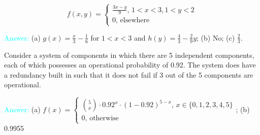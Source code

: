 \documentclass[14pt]{exam}
\begin{document}
\begin{questions}
		$$
			f(x, y) = \begin{cases}
				\frac{3x - y}{9},\, 1 < x < 3, 1 < y < 2\\
				0,\, \text{elsewhere}
			\end{cases}
		$$
		
		
		\textcolor{cyan}{Answer:} (a) $g(x) = \frac{x}{3} - \frac{1}{6}$ for $1 < x < 3$ and $h(y) = \frac{4}{3} - \frac{2}{9}y$; (b) No; (c) $\frac{2}{3}$.
		
		\question
		Consider a system of components in which there are 5 independent components, each of which possesses an operational probability of 0.92. The system does have a redundancy built in such that it does not fail if 3 out of the 5 components are operational.
		
		
		\textcolor{cyan}{Answer:} (a) $f(x) = \begin{cases}
			\binom{5}{x} \cdot 0.92^x \cdot (1 - 0.92)^{5 - x},\, x \in \{0, 1, 2, 3, 4, 5\}\\
			0,\, \text{otherwise}
		\end{cases}$; (b) 0.9955
		
 	\end{questions}
\end{document}
